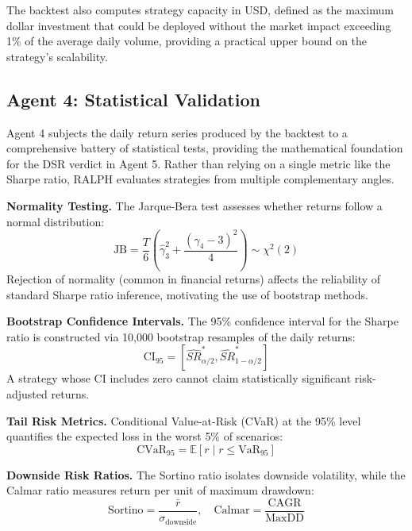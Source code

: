 \documentclass[conference]{IEEEtran}
\begin{document}
The backtest also computes strategy capacity in USD, defined as the maximum dollar investment that could be deployed without the market impact exceeding 1\% of the average daily volume, providing a practical upper bound on the strategy's scalability.

\subsection{Agent 4: Statistical Validation}

Agent 4 subjects the daily return series produced by the backtest to a comprehensive battery of statistical tests, providing the mathematical foundation for the DSR verdict in Agent 5. Rather than relying on a single metric like the Sharpe ratio, RALPH evaluates strategies from multiple complementary angles.

\textbf{Normality Testing.} The Jarque-Bera test assesses whether returns follow a normal distribution:
\begin{equation}
    \text{JB} = \frac{T}{6}\left(\hat{\gamma}_3^2 + \frac{(\hat{\gamma}_4 - 3)^2}{4}\right) \sim \chi^2(2)
\end{equation}
Rejection of normality (common in financial returns) affects the reliability of standard Sharpe ratio inference, motivating the use of bootstrap methods.

\textbf{Bootstrap Confidence Intervals.} The 95\% confidence interval for the Sharpe ratio is constructed via 10,000 bootstrap resamples of the daily returns:
\begin{equation}
    \text{CI}_{95} = [\widehat{SR}_{\alpha/2}^{*}, \widehat{SR}_{1-\alpha/2}^{*}]
\end{equation}
A strategy whose CI includes zero cannot claim statistically significant risk-adjusted returns.

\textbf{Tail Risk Metrics.} Conditional Value-at-Risk (CVaR) at the 95\% level quantifies the expected loss in the worst 5\% of scenarios:
\begin{equation}
    \text{CVaR}_{95} = \mathbb{E}[r \mid r \leq \text{VaR}_{95}]
\end{equation}

\textbf{Downside Risk Ratios.} The Sortino ratio isolates downside volatility, while the Calmar ratio measures return per unit of maximum drawdown:
\begin{equation}
    \text{Sortino} = \frac{\bar{r}}{\sigma_{\text{downside}}}, \quad \text{Calmar} = \frac{\text{CAGR}}{\text{MaxDD}}
\end{equation}
\end{document}
